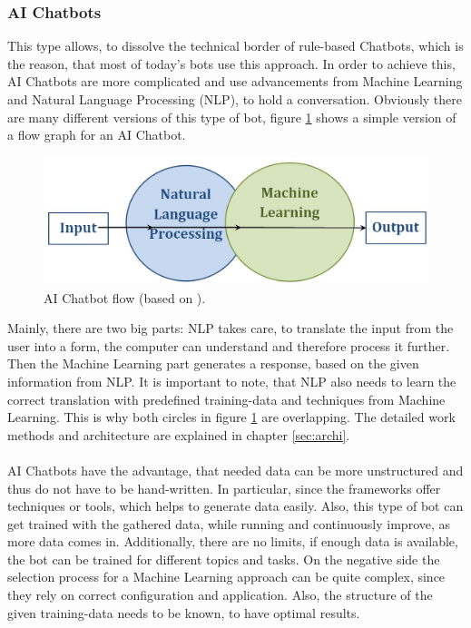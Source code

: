 \documentclass[10pt,final,journal,a4paper,oneside,twocolumn]{IEEEtran}
\begin{document}
\subsubsection{AI Chatbots}
This type allows, to dissolve the technical border of rule-based Chatbots, which is the reason, that most of today's bots use this approach. In order to achieve this, AI Chatbots are more complicated and use advancements from Machine Learning and Natural Language Processing (NLP), to hold a conversation. Obviously there are many different versions of this type of bot, figure \ref{aiflow} shows a simple version of a flow graph for an AI Chatbot.  
\begin{figure}[htbp]
	\centerline{\includegraphics[width=1\linewidth]{pictures/aiflow.jpg}}
	\caption{AI Chatbot flow (based on \cite{b9}).}
	\label{aiflow}
\end{figure}
Mainly, there are two big parts: NLP takes care, to translate the input from the user into a form, the computer can understand and therefore process it further. Then the Machine Learning part generates a response, based on the given information from NLP. It is important to note, that NLP also needs to learn the correct translation with predefined training-data and techniques from Machine Learning. This is why both circles in figure \ref{aiflow} are overlapping. The detailed work methods and architecture are explained in chapter \ref{sec:archi}.\\
\\
AI Chatbots have the advantage, that needed data can be more unstructured and thus do not have to be hand-written. In particular, since the frameworks offer techniques or tools, which helps to generate data easily. Also, this type of bot can get trained with the gathered data, while running and continuously improve, as more data comes in. Additionally, there are no limits, if enough data is available, the bot can be trained for different topics and tasks. On the negative side the selection process for a Machine Learning approach can be quite complex, since they rely on correct configuration and application. Also, the structure of the given training-data needs to be known, to have optimal results.\\
\end{document}
